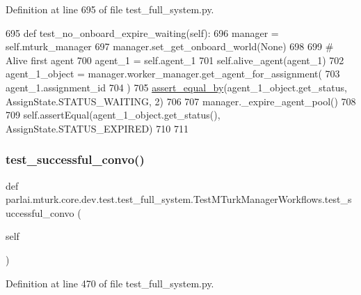 Definition at line 695 of file test\+\_\+full\+\_\+system.\+py.


\begin{DoxyCode}
695     \textcolor{keyword}{def }test\_no\_onboard\_expire\_waiting(self):
696         manager = self.mturk\_manager
697         manager.set\_get\_onboard\_world(\textcolor{keywordtype}{None})
698 
699         \textcolor{comment}{# Alive first agent}
700         agent\_1 = self.agent\_1
701         self.alive\_agent(agent\_1)
702         agent\_1\_object = manager.worker\_manager.get\_agent\_for\_assignment(
703             agent\_1.assignment\_id
704         )
705         \hyperlink{namespaceparlai_1_1mturk_1_1core_1_1test_1_1test__full__system_a0b463246d35658a2e422010f13dcf819}{assert\_equal\_by}(agent\_1\_object.get\_status, AssignState.STATUS\_WAITING, 2)
706 
707         manager.\_expire\_agent\_pool()
708 
709         self.assertEqual(agent\_1\_object.get\_status(), AssignState.STATUS\_EXPIRED)
710 
711 
\end{DoxyCode}
\mbox{\label{classparlai_1_1mturk_1_1core_1_1dev_1_1test_1_1test__full__system_1_1TestMTurkManagerWorkflows_a584e2c301ed81a4cd3b68520ed6e0096}} 
\subsubsection{\texorpdfstring{test\+\_\+successful\+\_\+convo()}{test\_successful\_convo()}}
{\footnotesize\ttfamily def parlai.\+mturk.\+core.\+dev.\+test.\+test\+\_\+full\+\_\+system.\+Test\+M\+Turk\+Manager\+Workflows.\+test\+\_\+successful\+\_\+convo (\begin{DoxyParamCaption}\item[{}]{self }\end{DoxyParamCaption})}



Definition at line 470 of file test\+\_\+full\+\_\+system.\+py.


